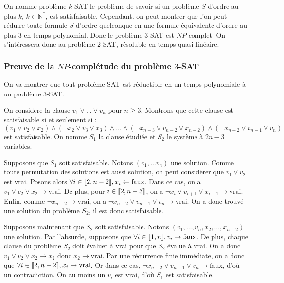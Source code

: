 On nomme problème $k$-SAT le problème de savoir si un problème $S$ d'ordre au
plus $k$, $k\in\mathbb{N}^*$, est satisfaisable. Cependant, on peut montrer
que l'on peut réduire toute formule $S$ d'ordre quelconque en une formule
équivalente d'ordre au plus $3$ en temps polynomial. Donc le problème $3$-SAT
est $NP$-complet. On s'intéressera donc au problème $2$-SAT, résoluble en temps
quasi-linéaire.

\subsubsection{Preuve de la $NP$-complétude du problème $3$-SAT}
On va montrer que tout problème SAT est réductible en un temps polynomiale à
un problème 3-SAT.

On considère la clause $v_1 \vee \ldots \vee v_n$ pour $n \geq 3$. Montrons que
cette clause est satisfaisable si et seulement si :
\[ (v_1 \vee v_2 \vee x_2) \wedge (\neg x_2 \vee v_3 \vee x_3) \wedge \ldots
\wedge (\neg x_{n-3} \vee v_{n-2} \vee x_{n-2}) \wedge (\neg x_{n-2} \vee v_{n-1} \vee v_n) \]
est satisfaisable. On nomme $S_1$ la clause étudiée et $S_2$ le système à
$2n - 3$ variables.

Supposons que $S_1$ soit satisfaisable. Notons $(v_1,\ldots v_n)$ une
solution. Comme toute permutation des solutions est aussi solution, on peut
considérer que $v_1 \vee v_2$ est vrai. Posons alors
$\forall i\in\llbracket 2, n-2 \rrbracket, x_i \leftarrow \text{faux}$. Dans ce cas, on a
$v_1 \vee v_2 \vee x_2 \rightarrow \text{vrai}$. De plus, pour $i\in\llbracket 2, n-3 \rrbracket$,
on a $\neg x_i \vee v_{i+1} \vee x_{i+1} \rightarrow \text{vrai}$. Enfin, comme
$\neg x_{n-2} \rightarrow \text{vrai}$, on a
$\neg x_{n-2} \vee v_{n-1} \vee v_n \rightarrow \text{vrai}$. On a donc trouvé
une solution du problème $S_2$, il est donc satisfaisable.

Supposons maintenant que $S_2$ soit satisfaisable. Notons $(v_1,\ldots,v_n,x_2,\ldots,x_{n-2})$
une solution. Par l'absurde, supposons que $\forall i\in\llbracket 1, n \rrbracket, v_i \rightarrow \text{faux}$.
De plus, chaque clause du problème $S_2$ doit évaluer à vrai pour que $S_2$
évalue à vrai. On a donc $v_1\vee v_2\vee x_2 \rightarrow x_2$ donc
$x_2 \rightarrow \text{vrai}$. Par une récurrence finie immédiate, on a donc
que $\forall i\in\llbracket 2, n-2 \rrbracket, x_i \rightarrow\text{vrai}$. Or dans ce cas,
$\neg x_{n-2}\vee v_{n-1}\vee v_n \rightarrow\text{faux}$, d'où un
contradiction. On au moins un $v_i$ est vrai, d'où $S_1$ est satisfaisable.

